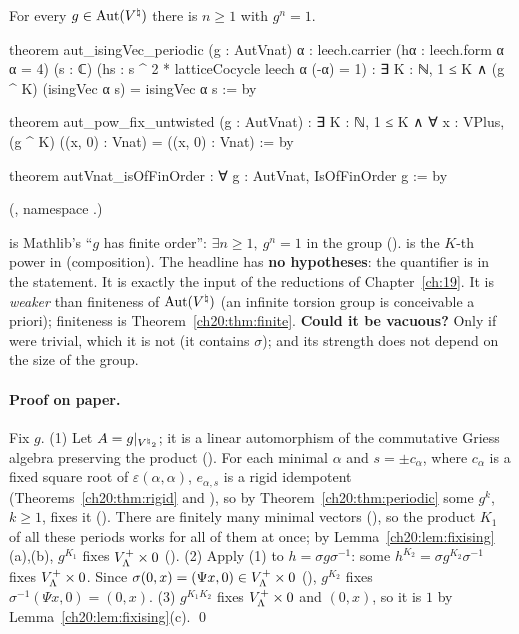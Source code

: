 \begin{theorem}\label{ch20:thm:finorder}
For every $g\in\operatorname{Aut}({V^{\natural}})$ there is $n\ge1$ with $g^n=1$.
\end{theorem}
\begin{leancode}
theorem aut_isingVec_periodic (g : AutVnat) {α : leech.carrier}
    (hα : leech.form α α = 4) (s : ℂ)
    (hs : s ^ 2 * latticeCocycle leech α (-α) = 1) :
    ∃ K : ℕ, 1 ≤ K ∧ (g ^ K) (isingVec α s) = isingVec α s := by

theorem aut_pow_fix_untwisted (g : AutVnat) :
    ∃ K : ℕ, 1 ≤ K ∧ ∀ x : VPlus, (g ^ K) ((x, 0) : Vnat) = ((x, 0) : Vnat) := by

theorem autVnat_isOfFinOrder : ∀ g : AutVnat, IsOfFinOrder g := by
\end{leancode}
(, namespace .)
\begin{dictionary}
 is Mathlib's ``$g$ has finite order'': $\exists n\ge1,\ g^n=1$ in the group 
().   is the $K$-th power in  (composition).  The headline has
\textbf{no hypotheses}: the quantifier  is in the statement.  It is exactly the input
 of the reductions of Chapter~\ref{ch:19}.  It is \emph{weaker} than finiteness of $\operatorname{Aut}({V^{\natural}})$ (an infinite
torsion group is conceivable a priori); finiteness is Theorem~\ref{ch20:thm:finite}.  \textbf{Could it be vacuous?}  Only if
 were trivial, which it is not (it contains $\sigma$); and its strength does not depend on the size of the group.
\end{dictionary}
\paragraph{Proof on paper.}  Fix $g$.  (1) Let $A=g|_{{V^{\natural}}_2}$; it is a linear automorphism of the commutative Griess
algebra preserving the product ().  For each minimal $\alpha$ and $s=\pm c_\alpha$, where $c_\alpha$
is a fixed square root of $\varepsilon(\alpha,\alpha)$, $e_{\alpha,s}$ is a rigid idempotent (Theorems~\ref{ch20:thm:rigid} and
), so by Theorem~\ref{ch20:thm:periodic} some $g^{k}$, $k\ge1$, fixes it
().  There are finitely many minimal vectors (), so the product
$K_1$ of all these periods works for all of them at once; by Lemma~\ref{ch20:lem:fixising}(a),(b), $g^{K_1}$ fixes
$V_{\Lambda}^{+}\times0$ ().  (2) Apply (1) to $h=\sigma g\sigma^{-1}$: some $h^{K_2}=\sigma g^{K_2}\sigma^{-1}$
fixes $V_{\Lambda}^{+}\times0$.  Since $\sigma(0,x)=(\Psi x,0)\in V_{\Lambda}^{+}\times0$ (), $g^{K_2}$ fixes
$\sigma^{-1}(\Psi x,0)=(0,x)$.  (3) $g^{K_1K_2}$ fixes $V_{\Lambda}^{+}\times0$ and $(0,x)$, so it is $1$ by
Lemma~\ref{ch20:lem:fixising}(c). \qed

